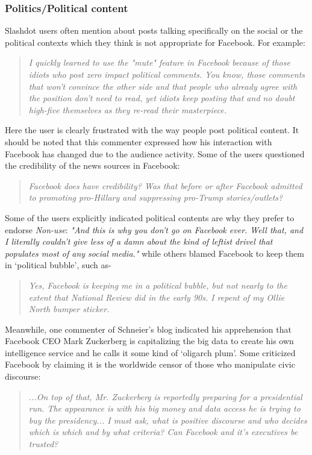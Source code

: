  \subsubsection{Politics/Political content}
 Slashdot users often mention about posts talking specifically on the social or the political contexts which they think is not appropriate for Facebook. For example:
     \begin{quote}
         \textit{I quickly learned to use the "mute" feature in Facebook because of those idiots who post zero impact political comments. You know, those comments that won't convince the other side and that people who already agree with the position don't need to read, yet idiots keep posting that and no doubt high-five themselves as they re-read their masterpiece.}
     \end{quote}

Here the user is clearly frustrated with the way people post political content. It should be noted that this commenter expressed how his interaction with Facebook has changed due to the audience activity. Some of the users questioned the credibility of the news sources in Facebook:
    \begin{quote}
\textit{Facebook does have credibility?
Was that before or after Facebook admitted to promoting pro-Hillary and suppressing pro-Trump stories/outlets?}
    \end{quote}
    
Some of the users explicitly indicated political contents are why they prefer to endorse \emph{Non-use}: \textit{"And this is why you don't go on Facebook ever. Well that, and I literally couldn't give less of a damn about the kind of leftist drivel that populates most of any social media."} while others blamed Facebook to keep them in `political bubble', such as-

\begin{quote}
         \textit{ Yes, Facebook is keeping me in a political bubble, but not nearly to the extent that National Review did in the early 90s. I repent of my Ollie North bumper sticker. }
    \end{quote}
    
Meanwhile, one commenter of Schneier's blog indicated his apprehension that Facebook CEO Mark Zuckerberg is capitalizing the big data to create his own intelligence service and he calls it some kind of `oligarch plum'. Some criticized Facebook by claiming it is the worldwide censor of those who manipulate civic discourse:
\begin{quote}
         \textit{...On top of that, Mr. Zuckerberg is reportedly preparing for a presidential run. The appearance is with his big money and data access he is trying to buy the presidency... I must ask, what is positive discourse and who decides which is which and by what criteria? Can Facebook and it's executives be trusted? }
    \end{quote}
